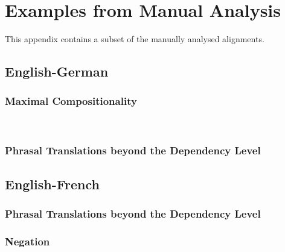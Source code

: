 %

%
\appendix
\chapter{Examples from Manual Analysis}

This appendix contains a subset of the manually analysed alignments.

\section{English-German}

\subsection{Maximal Compositionality}
\label{subsec:de_noncomp}

\\




\subsection{Phrasal Translations beyond the Dependency Level}
\label{subsec:de_phrasal}



\section{English-French}

\subsection{Phrasal Translations beyond the Dependency Level}
\label{subsec:fr_phrasal}



\subsection{Negation}
\label{subsec:negation}



\restoregeometry
%